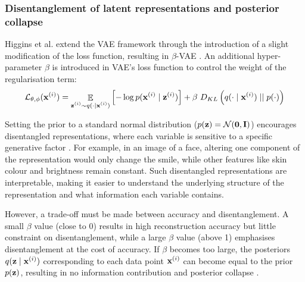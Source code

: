 \subsubsection{Disentanglement of latent representations and posterior collapse} \label{cha:disentang}
	Higgins et al. extend the VAE framework through the introduction of a slight modification of the loss function, resulting in $\beta$-VAE \citep{higginsBetaVAELearningBasic2022}. An additional hyper-parameter $\beta$ is introduced in VAE's loss function to control the weight of the regularisation term:
	$$
	\mathcal{L}_{\theta, \phi} (\mathbf{x}^{(i)}) = \mathop{\mathbb{E}}_{\substack{\mathbf{z}^{(i)} \sim q (\cdot \mid \mathbf{x}^{(i)})}} \left[ -\log p (\mathbf{x}^{(i)} \mid \mathbf{z}^{(i)}) \right] + \beta~ D_{KL} \left(  q (\cdot \mid \mathbf{x}^{(i)})  \mid \mid  p(\cdot)  \right)
	$$
	
	Setting the prior to a standard normal distribution ($p(\mathbf{z}) = \mathcal{N}(\bm{\mathbf{0}}, \mathbf{I})$) encourages disentangled representations, where each variable is sensitive to a specific generative factor \citep{higginsBetaVAELearningBasic2022, bengioRepresentationLearningReview2013}. For example, in an image of a face, altering one component of the representation would only change the smile, while other features like skin colour and brightness remain constant. Such disentangled representations are interpretable, making it easier to understand the underlying structure of the representation and what information each variable contains.
	
	However, a trade-off must be made between accuracy and disentanglement. A small $\beta$ value (close to 0) results in high reconstruction accuracy but little constraint on disentanglement, while a large $\beta$ value (above 1) emphasises disentanglement at the cost of accuracy. If $\beta$ becomes too large, the posteriors $q (\mathbf{z} \mid \mathbf{x}^{(i)})$ corresponding to each data point $\mathbf{x}^{(i)}$ can become equal to the prior $p(\mathbf{z})$, resulting in no information contribution and posterior collapse \citep{lucasUnderstandingPosteriorCollapse2022}.
	

	
	
	

%
%
	
